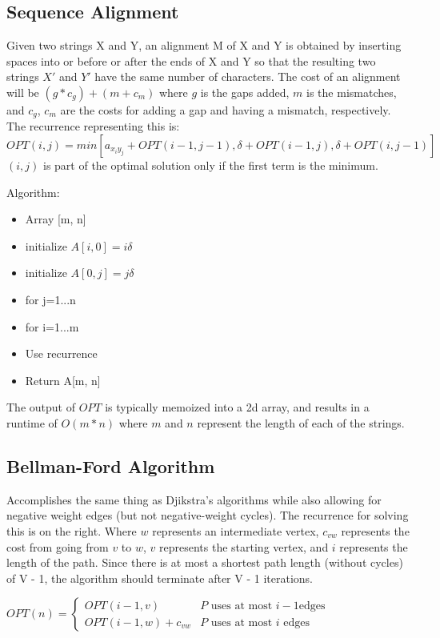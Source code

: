 \documentclass{article}
\begin{document}
\subsection{Sequence Alignment}

\begin{multicols}{2}
Given two strings X and Y, an alignment M of X and Y is obtained by inserting spaces into or
before or after the ends of X and Y so that the resulting two strings $X'$ and $Y'$  have the same number of characters.
The cost of an alignment will be $(g * c_g) + (m + c_m)$ where $g$ is the gaps added, $m$ is the mismatches, and $c_g$, $c_m$
are the costs for adding a gap and having a mismatch, respectively.
The recurrence representing this is: $OPT(i, j) = min[a_{x_iy_j} + OPT(i - 1, j - 1),\delta + OPT(i - 1, j), \delta + OPT(i, j - 1)]$ \\ 
$(i,j)$ is part of the optimal solution only if the first term is the minimum.

\columnbreak

Algorithm:
\begin{itemize}
    \item Array [m, n]
    \item initialize $A[i, 0] = i\delta$
    \item initialize $A[0, j] = j\delta$
    \item for j=1...n
    \item \quad for i=1...m
    \item \quad \quad Use recurrence
    \item Return A[m, n]
\end{itemize}
\end{multicols}

\noindent The output of $OPT$ is typically memoized into a 2d array, and results in a runtime of $O(m * n)$ where $m$ and $n$ represent
the length of each of the strings.

\subsection{Bellman-Ford Algorithm}
\begin{multicols}{2}
Accomplishes the same thing as Djikstra's algorithms while also allowing for negative
weight edges (but not negative-weight cycles). The recurrence for solving this is on the right.
Where $w$ represents an intermediate vertex, $c_{vw}$ represents the cost from going from $v$ to $w$,
$v$ represents the starting vertex, and $i$ represents the length of the path. Since there is at most a shortest path length (without cycles) of V - 1, the algorithm should terminate after V - 1 iterations.
\columnbreak

$OPT(n) = \begin{cases}
    OPT(i-1, v)  & P \text{ uses at most } i-1 \text{edges} \\
    OPT(i-1, w) + c_{vw} & P \text{ uses at most } i \text{ edges}
  \end{cases}$
\end{multicols}
\end{document}
